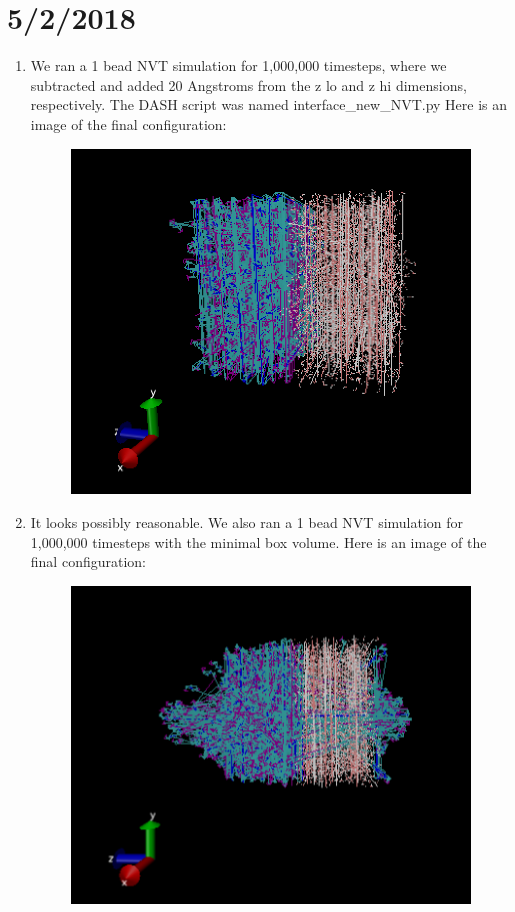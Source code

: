 \documentclass[12pt,reqno]{amsart}
\numberwithin{equation}{section}
\begin{document}
\section{5/2/2018}

\begin{enumerate}
\item We ran a 1 bead NVT simulation for 1,000,000 timesteps, where we subtracted and added 20 Angstroms from the z lo and z hi dimensions, respectively.  The DASH script was named interface\_new\_NVT.py  Here is an image of the final configuration:

\begin{figure}[H]
\centering
\includegraphics[scale=0.4]{wide-NVT-1bead}
\end{figure}

\item It looks possibly reasonable.  We also ran a 1 bead NVT simulation for 1,000,000 timesteps with the minimal box volume.  Here is an image of the final configuration:

\begin{figure}[H]
\centering
\includegraphics[scale=0.4]{original-NVT}
\end{figure}


\end{enumerate}
\end{document}

